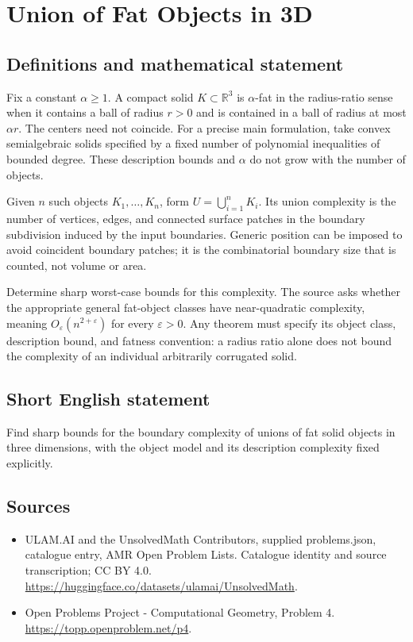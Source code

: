 \documentclass[11pt,a4paper]{article}
\begin{document}
\section*{Union of Fat Objects in 3D}\label{statement}

\subsection{Definitions and mathematical statement}
Fix a constant $\alpha\ge1$. A compact solid $K\subset\mathbb R^3$ is
$\alpha$-fat in the radius-ratio sense when it contains a ball of radius
$r>0$ and is contained in a ball of radius at most $\alpha r$. The centers
need not coincide. For a precise main formulation, take convex
semialgebraic solids specified by a fixed number of polynomial
inequalities of bounded degree. These description bounds and $\alpha$
do not grow with the number of objects.

Given $n$ such objects $K_1,\ldots,K_n$, form
$U=\bigcup_{i=1}^nK_i$. Its union complexity is the number of vertices,
edges, and connected surface patches in the boundary subdivision induced
by the input boundaries. Generic position can be imposed to avoid
coincident boundary patches; it is the combinatorial boundary size that
is counted, not volume or area.

Determine sharp worst-case bounds for this complexity. The source asks
whether the appropriate general fat-object classes have near-quadratic
complexity, meaning $O_\varepsilon(n^{2+\varepsilon})$ for every
$\varepsilon>0$. Any theorem must specify its object class, description
bound, and fatness convention: a radius ratio alone does not bound the
complexity of an individual arbitrarily corrugated solid.
\subsection{Short English statement}
Find sharp bounds for the boundary complexity of unions of fat solid
objects in three dimensions, with the object model and its description
complexity fixed explicitly.
\subsection{Sources}
\begin{itemize}
\item[S1] ULAM.AI and the UnsolvedMath Contributors, supplied problems.json, catalogue entry, AMR Open Problem Lists. Catalogue identity and source transcription; CC BY 4.0.
\url{https://huggingface.co/datasets/ulamai/UnsolvedMath}.
\item[S2] Open Problems Project - Computational Geometry, Problem 4. 
\url{https://topp.openproblem.net/p4}.
\end{itemize}
\end{document}
